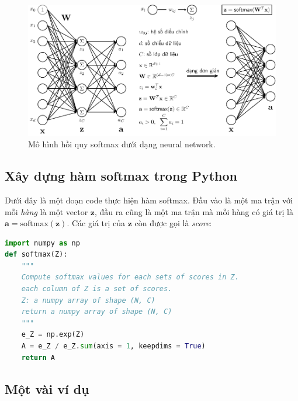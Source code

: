 \begin{figure}[t]
\centering
\includegraphics[width =
.9\textwidth]{Chapters/05_NeuralNetworks/13_softmax/latex/softmax_nn.pdf}
\caption[]{Mô hình hồi quy softmax dưới dạng neural network.}
\label{fig:13_2}
\end{figure}





\subsection{Xây dựng hàm softmax trong Python }
Dưới đây là một đoạn code thực hiện hàm softmax. Đầu vào là một ma trận với mỗi
\textit{hàng} là một vector $\mathbf{z}$, đầu ra cũng là một ma trận mà mỗi hàng có
giá
trị là $\mathbf{a} = \text{softmax}(\mathbf{z})$. Các giá trị của $\mathbf{z}$ còn được gọi là \textit{score}:

\begin{lstlisting}[language=Python]
import numpy as np
def softmax(Z):
    """
    Compute softmax values for each sets of scores in Z.
    each column of Z is a set of scores.
    Z: a numpy array of shape (N, C)
    return a numpy array of shape (N, C)
    """
    e_Z = np.exp(Z)
    A = e_Z / e_Z.sum(axis = 1, keepdims = True)
    return A
\end{lstlisting}


\subsection{Một vài ví dụ }

